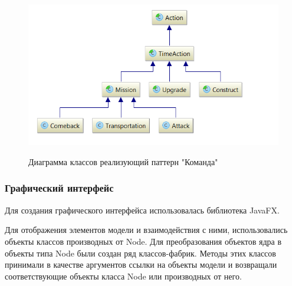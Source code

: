 \begin{figure}[H]
\centering
\includegraphics[scale=0.5]{d3.png}
\label{pic:d3}
\caption{Диаграмма классов  реализующий паттерн "Команда"}
\end{figure}

\subsubsection{Графический интерфейс}

Для создания графического интерфейса использовалась библиотека JavaFX.  

Для отображения элементов модели и взаимодействия с ними, использовались объекты классов производных от Node. Для преобразования объектов ядра в объекты типа Node были создан ряд классов-фабрик. Методы этих классов принимали в качестве аргументов ссылки на объекты модели и возвращали соответствующие объекты класса Node или производных от него.

